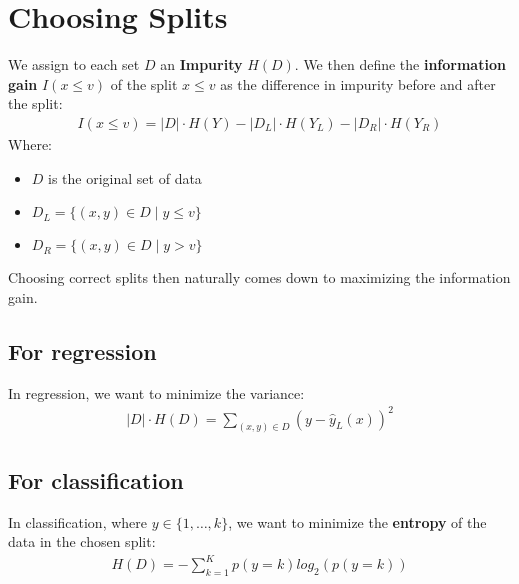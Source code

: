 \documentclass{report}
\newcommand{\tbf}{\textbf}
\newcommand{\yhat}{\hat{y}}
\begin{document}
\section{Choosing Splits}
We assign to each set $D$ an \tbf{Impurity} $H(D)$.
We then define the \tbf{information gain} $I(x \leq v)$ of the split $x \leq v$ as the difference in impurity before and after the split:
\begin{align}
 I(x \leq v) = |D| \cdot H(Y) - |D_L| \cdot H(Y_L) - |D_R| \cdot H(Y_R)
\end{align}
Where:
\begin{itemize}
 \item $D$ is the original set of data
 \item $D_L = \{(x,y) \in D \mid y \leq v\}$
 \item $D_R = \{(x,y) \in D \mid y > v\}$
\end{itemize}
Choosing correct splits then naturally comes down to maximizing the information gain.
\subsection{For regression}
In regression, we want to minimize the variance:
\begin{align}
 |D| \cdot H(D) = \sum_{(x,y) \in D} (y - \yhat_L(x))^2
\end{align}

\subsection{For classification}
In classification, where $y \in \{1, \hdots, k\}$, we want to minimize the \tbf{entropy} of the data in the chosen split:
\begin{align}
 H(D) = -\sum_{k=1}^K p(y = k) log_2(p(y=k))
\end{align}
\end{document}
